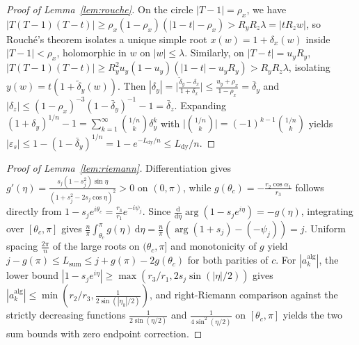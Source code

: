 \documentclass[10pt]{article}
\numberwithin{equation}{section}
\theoremstyle{plain}
\theoremstyle{definition}
\newcommand{\dd}{\mathrm{d}}
\newcommand{\1}{\mathbf{1}}
\begin{document}
\begin{proof}[Proof of Lemma~\ref{lem:rouche}]
On the circle $|T - 1| = \rho_x$, we have $|T(T - 1)(T - t)| \ge \rho_x(1 - \rho_x)(|1 - t| - \rho_x) > R_y R_z \lambda = |t R_z w|$, so Rouch\'e's theorem isolates a unique simple root $x(w) = 1 + \delta_x(w)$ inside $|T - 1| < \rho_x$, holomorphic in $w$ on $|w| \le \lambda$. Similarly, on $|T - t| = u_y R_y$, $|T(T - 1)(T - t)| \ge R_y^2 u_y(1 - u_y)(|1 - t| - u_y R_y) > R_y R_z \lambda$, isolating $y(w) = t(1 + \tilde{\delta}_y(w))$. Then $|\delta_y| = \bigl|\frac{\tilde{\delta}_y - \delta_x}{1 + \delta_x}\bigr| \le \frac{u_y + \rho_x}{1 - \rho_x} = \bar{\delta}_y$ and $|\delta_z| \le (1-\rho_x)^{-3}(1-\bar{\delta}_y)^{-1} - 1 = \bar{\delta}_z$. Expanding $(1 + \delta_y)^{1/n} - 1 = \sum_{k=1}^\infty \binom{1/n}{k}\delta_y^k$ with $\bigl|\binom{1/n}{k}\bigr| = (-1)^{k-1}\binom{1/n}{k}$ yields $|\varepsilon_s| \le 1 - (1 - \bar{\delta}_y)^{1/n} = 1 - e^{-L_{\mathrm{dy}}/n} \le L_{\mathrm{dy}}/n$.
\end{proof}

\begin{proof}[Proof of Lemma~\ref{lem:riemann}]
Differentiation gives $g'(\eta) = \frac{s_j(1 - s_j^2)\sin\eta}{(1 + s_j^2 - 2s_j\cos\eta)^2} > 0$ on $(0, \pi)$, while $g(\theta_c) = -\frac{r_2\cos\alpha_1}{r_3}$ follows directly from $1 - s_j e^{i\theta_c} = \frac{r_3}{r_1} e^{-i\psi_j}$. Since $\frac{\dd}{\dd\eta}\arg(1 - s_j e^{i\eta}) = -g(\eta)$, integrating over $[\theta_c, \pi]$ gives $\frac{n}{\pi}\int_{\theta_c}^\pi g(\eta)\,\dd\eta = \frac{n}{\pi}(\arg(1 + s_j) - (-\psi_j)) = j$. Uniform spacing $\frac{2\pi}{n}$ of the large roots on $(\theta_c, \pi]$ and monotonicity of $g$ yield $j - g(\pi) \le L_{\mathrm{sum}} \le j + g(\pi) - 2 g(\theta_c)$ for both parities of $c$. For $|a_k^{\mathrm{alg}}|$, the lower bound $|1 - s_j e^{i\eta}| \ge \max(r_3/r_1, 2 s_j\sin(|\eta|/2))$ gives $|a_k^{\mathrm{alg}}| \le \min(r_2/r_3, \frac{1}{2\sin(|\eta_k|/2)})$, and right-Riemann comparison against the strictly decreasing functions $\frac{1}{2\sin(\eta/2)}$ and $\frac{1}{4\sin^2(\eta/2)}$ on $[\theta_c, \pi]$ yields the two sum bounds with zero endpoint correction.
\end{proof}
\end{document}
